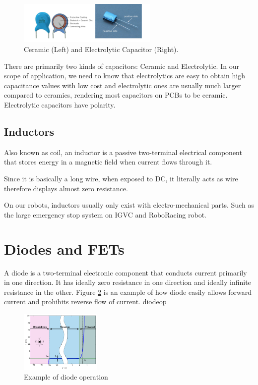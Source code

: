 \documentclass{article}
\begin{document}
\begin{figure}[!h]
	\center
	\includegraphics[width=0.6\textwidth, keepaspectratio]{ceramicvelectro}
	\caption{Ceramic (Left) and Electrolytic Capacitor (Right).}
	\label{fig:capacitortype}
\end{figure}

There are primarily two kinds of capacitors: Ceramic and Electrolytic. In our scope of application, we need to know that electrolytics are easy to obtain high capacitance values with low cost and electrolytic ones are usually much larger compared to ceramics, rendering most capacitors on PCBs to be ceramic. Electrolytic capacitors have polarity.

\subsection{Inductors}

Also known as coil, an inductor is a passive two-terminal electrical component that stores energy in a magnetic field when current flows through it. \par
Since it is basically a long wire, when exposed to DC, it literally acts as wire therefore displays almost zero resistance. \par
On our robots, inductors usually only exist with electro-mechanical parts. Such as the large emergency stop system on IGVC and RoboRacing robot.

\section{Diodes and FETs}

A diode is a two-terminal electronic component that conducts current primarily in one direction. It has ideally zero resistance in one direction and ideally infinite resistance in the other. Figure \ref{fig:diodeop} is an example of how diode easily allows forward current and prohibits reverse flow of current. 
diodeop

\begin{figure}[!h]
	\center
	\includegraphics[width=0.35\textwidth, keepaspectratio]{diodeop}
	\caption{Example of diode operation}
	\label{fig:diodeop}
\end{figure}
\end{document}
